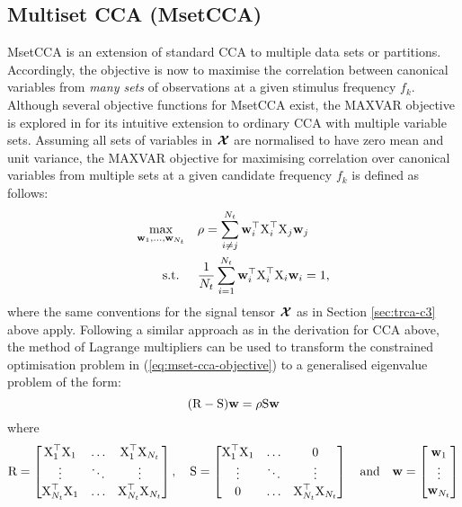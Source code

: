 \subsection{Multiset CCA (MsetCCA)}
MsetCCA is an extension of standard CCA to multiple data sets or partitions. Accordingly, the objective is now to maximise the correlation between canonical variables from \textit{many sets} of observations at a given stimulus frequency $f_k$. Although several objective functions for MsetCCA exist, the MAXVAR objective is explored in \cite{zhang-mset-cca} for its intuitive extension to ordinary CCA with multiple variable sets. Assuming all sets of variables in ${\bm{\mathcal{X}}}$ are normalised to have zero mean and unit variance, the MAXVAR objective for maximising correlation over canonical variables from multiple sets at a given candidate frequency $f_k$ is defined as follows:
\begin{align}
\begin{split}
\max_{\mathbf{w}_{1}, \ldots, \mathbf{w}_{N_t}} & \quad \rho=\sum_{i \neq j}^{N_t} \mathbf{w}_{i}^\top{\textrm{X}}_{i}^\top {\textrm{X}}_{j}\mathbf{w}_{j} \\
\text { s.t. } & \quad \frac{1}{N_t} \sum_{i=1}^{N_t} \mathbf{w}_{i}^\top{\textrm{X}}_{i}^\top {\textrm{X}}_{i}\mathbf{w}_{i}=1,
\end{split}
\label{eq:mset-cca-objective}
\end{align}
where the same conventions for the signal tensor ${\bm{\mathcal{X}}}$ as in Section \ref{sec:trca-c3} above apply. Following a similar approach as in the derivation for CCA above, the method of Lagrange multipliers can be used to transform the constrained optimisation problem in (\ref{eq:mset-cca-objective}) to a generalised eigenvalue problem of the form:
\begin{equation}
        ({\textrm{R}} -{\textrm{S}}){\mathbf{w}} = \rho{\textrm{S}} {\mathbf{w}}
\label{eq:mset-cca-gen-eig}
\end{equation}
where
\begin{align*}
{\textrm{R}} = \begin{bmatrix}
{\textrm{X}}_{1}^{\top}{\textrm{X}}_{1} & \ldots & {\textrm{X}}_{1}^{\top}{\textrm{X}}_{N_t} \\
\vdots & \ddots & \vdots \\
{\textrm{X}}_{N_t}^{\top}{\textrm{X}}_{1} & \ldots & {\textrm{X}}_{N_t}^{\top} {\textrm{X}}_{N_t}
\end{bmatrix},
\quad
{\textrm{S}} = \begin{bmatrix}
{\textrm{X}}_{1}^{\top}{\textrm{X}}_{1} & \ldots & 0 \\
\vdots & \ddots & \vdots \\
0 & \ldots & {\textrm{X}}_{N_t}^{\top} {\textrm{X}}_{N_t}
\end{bmatrix}
\quad
\textrm{and}
\quad
{\mathbf{w}} = \begin{bmatrix}
{\mathbf{w}}_1 \\ \vdots \\ {\mathbf{w}}_{N_t}
\end{bmatrix}
\end{align*}
